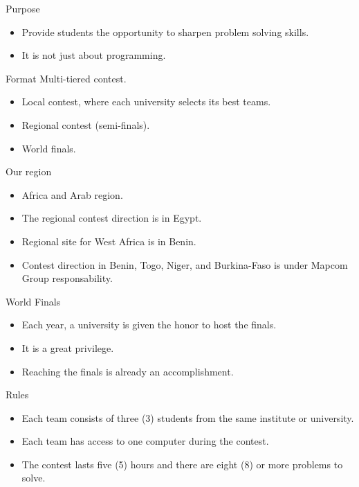 \documentclass{beamer}
\begin{document}
\begin{frame}{Purpose}
\begin{itemize}
  \justifying
  \item Provide students the opportunity to sharpen problem solving skills.
  \item It is not just about programming.  
\end{itemize}
\end{frame}

\begin{frame}{Format}
Multi-tiered contest.
\begin{itemize}
  \justifying
  \item Local contest, where each university selects its best teams.
  \item Regional contest (semi-finals).
  \item World finals.
\end{itemize}
\end{frame}

\begin{frame}{Our region}
\begin{itemize}
  \justifying
  \item Africa and Arab region.
  \item The regional contest direction is in Egypt.
  \item Regional site for West Africa is in Benin.
  \item Contest direction in Benin, Togo, Niger, and Burkina-Faso is under Mapcom Group responsability.
\end{itemize}
\end{frame}

\begin{frame}{World Finals}
\begin{itemize}
  \justifying
  \item Each year, a university is given the honor to host the finals.
  \item It is a great privilege.
  \item Reaching the finals is already an accomplishment.
\end{itemize}
\end{frame}

\begin{frame}{Rules}
\begin{itemize}
  \justifying
  \item Each team consists of three (3) students from the same institute or university.
  \item Each team has access to one computer during the contest.
  \item The contest lasts five (5) hours and there are eight (8) or more problems to solve.
\end{itemize}
\end{frame}
\end{document}
